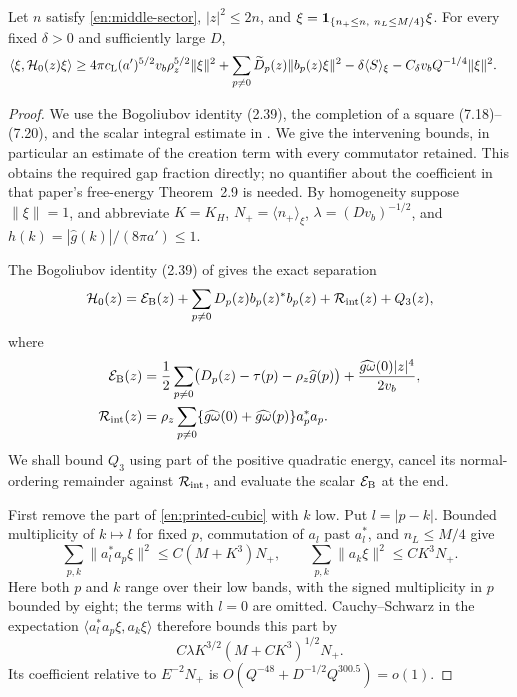 \begin{lemma}
\label{en:small-gap}
Let $n$ satisfy \eqref{en:middle-sector}, $|z|^2\le2n$, and
$\xi=\mathbf 1_{\{n_+\le n,\ n_L\le M/4\}}\xi$.  For every fixed $\delta>0$
and sufficiently large $D$,
\begin{align}
 \langle\xi,\mathcal H_0(z)\xi\rangle
 &\ge 4\pi c_{\rm L}(a')^{5/2}v_b\rho_z^{5/2}\|\xi\|^2
       +\sum_{p\ne0}\widetilde D_p(z)\|b_p(z)\xi\|^2
       -\delta\langle S\rangle_\xi
       -C_\delta v_bQ^{-1/4}\|\xi\|^2 .
                                                        \label{en:small-gap-bound}
\end{align}
\end{lemma}

\begin{proof}
We use the Bogoliubov identity (2.39), the completion of a square
(7.18)--(7.20), and the scalar integral estimate in
\cite[Lemma~A.1]{FJGMOT}.  We give the intervening bounds, in particular
an estimate of the creation term with every commutator retained.
This obtains the required gap fraction directly; no quantifier about
the coefficient in that paper's free-energy Theorem~2.9 is needed.
By homogeneity suppose $\|\xi\|=1$, and abbreviate
$K=K_H$, $N_+=\langle n_+\rangle_\xi$,
$\lambda=(Dv_b)^{-1/2}$, and
$h(k)=|\widehat g(k)|/(8\pi a')\le1$.

The Bogoliubov identity (2.39) of \cite{FJGMOT} gives the exact
separation
\begin{equation}\label{en:H0-decomposition}
 \mathcal H_0(z)=\mathcal E_{\rm B}(z)
       +\sum_{p\ne0}D_p(z)b_p(z)^*b_p(z)
       +\mathcal R_{\rm int}(z)+Q_3(z),
\end{equation}
where
\begin{align*}
 \mathcal E_{\rm B}(z)
   &=\frac12\sum_{p\ne0}
          \bigl(D_p(z)-\tau(p)-\rho_z\widehat g(p)\bigr)
            +\frac{\widehat{g\omega}(0)|z|^4}{2v_b},\\
 \mathcal R_{\rm int}(z)
   &=\rho_z\sum_{p\ne0}
       \{\widehat{g\omega}(0)+\widehat{g\omega}(p)\}a_p^*a_p.
\end{align*}
We shall bound $Q_3$ using part of the positive quadratic energy,
cancel its normal-ordering remainder against $\mathcal R_{\rm int}$,
and evaluate the scalar $\mathcal E_{\rm B}$ at the end.

First remove the part of \eqref{en:printed-cubic} with $k$ low.
Put $l=|p-k|$.  Bounded multiplicity of $k\mapsto l$ for fixed $p$,
commutation of $a_l$ past $a_l^*$, and $n_L\le M/4$ give
\[
 \sum_{p,k}\|a_l^*a_p\xi\|^2\le C(M+K^3)N_+,
 \qquad
 \sum_{p,k}\|a_k\xi\|^2\le CK^3N_+.
\]
Here both $p$ and $k$ range over their low bands, with the signed
multiplicity in $p$ bounded by eight; the terms with $l=0$ are omitted.
Cauchy--Schwarz in the expectation
$\langle a_l^*a_p\xi,a_k\xi\rangle$ therefore bounds this part by
\[
 C\lambda K^{3/2}(M+CK^3)^{1/2}N_+.
\]
Its coefficient relative to $E^{-2}N_+$ is
$O(Q^{-48}+D^{-1/2}Q^{300.5})=o(1)$.


\end{proof}
